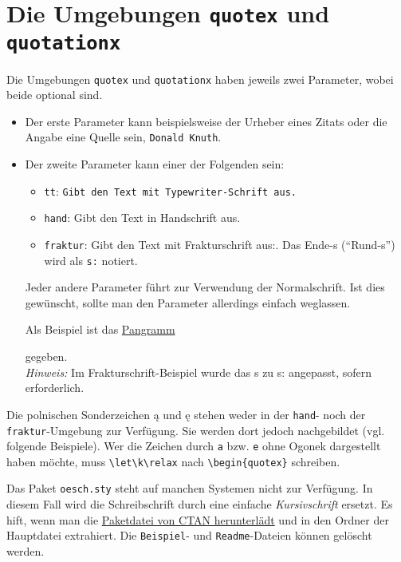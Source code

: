 		\section{Die Umgebungen \texttt{quotex} und \texttt{quotationx}}
			\label{quotex_quotationx}
			
			Die Umgebungen \texttt{quotex} und \texttt{quotationx} haben jeweils zwei Parameter, wobei beide optional sind.
			\begin{itemize}
				\item Der erste Parameter kann beispielsweise der Urheber eines Zitats oder die Angabe eine Quelle sein, \zb \texttt{Donald Knuth}.
				\item Der zweite Parameter kann einer der Folgenden sein:
					\begin{itemize}
						\item \texttt{tt}: {\tt Gibt den Text mit Typewriter-Schrift aus.}
						\item \texttt{hand}: {\oeschfamily Gibt den Text in Handschrift aus.}
						\item \texttt{fraktur}: {\frakfamily Gibt den Text mit Frakturschrift aus:.} Das Ende-s ("`Rund-s"') wird als \verb|s:| notiert.
					\end{itemize}
					Jeder andere Parameter führt zur Verwendung der Normalschrift. Ist dies gewünscht, sollte man den Parameter allerdings einfach weglassen. 
					
					\newpage
					Als Beispiel ist das \href{https://de.wikipedia.org/wiki/Pangramm\#Liste_deutscher_Pangramme}{Pangramm} 
					\begin{quote}
						\pangramm
					\end{quote}
					gegeben.\\
					\emph{Hinweis:} Im Frakturschrift-Beispiel wurde das {\frakfamily s} zu {\frakfamily s:} angepasst, sofern erforderlich.
			\end{itemize}
			
			\begin{redbox}
				Die polnischen Sonderzeichen \k a und \k e stehen weder in der \texttt{hand}- noch der \texttt{fraktur}-Umgebung zur Verfügung. Sie werden dort jedoch nachgebildet (vgl. folgende Beispiele). Wer die Zeichen durch \texttt{a} bzw. \texttt{e} ohne Ogonek dargestellt haben möchte, muss \verb|\let\k\relax| nach \texttt{\textbackslash begin\{quotex\}} schreiben. 
			\end{redbox}
			
			\begin{redbox}
				Das Paket \texttt{oesch.sty} steht auf manchen Systemen nicht zur Verfügung. In diesem Fall wird die {\oeschfamily Schreibschrift} durch eine einfache \emph{Kursivschrift} ersetzt. Es hift, wenn man die \href{https://www.ctan.org/tex-archive/fonts/oesch?lang=de}{Paketdatei von CTAN herunterlädt} und in den Ordner der Hauptdatei extrahiert. Die \texttt{Beispiel}- und \texttt{Readme}-Dateien können gelöscht werden.
			\end{redbox}
			
